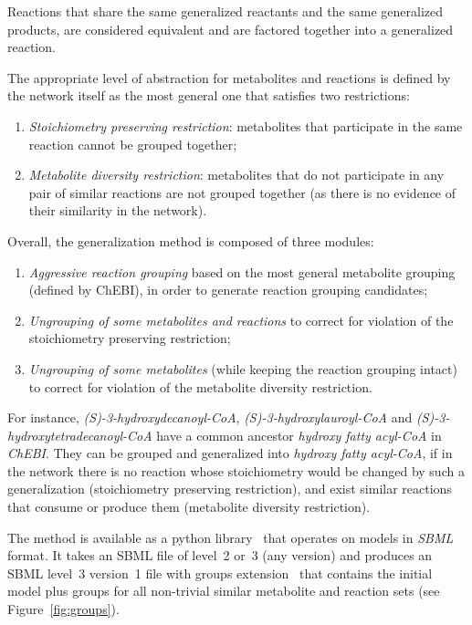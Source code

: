 \documentclass{bmcart}
\begin{document}
Reactions that share the same generalized reactants and the same generalized products, are considered equivalent and are factored together into a generalized reaction. 

The appropriate level of abstraction for metabolites and reactions is defined by the network itself as the most general one that satisfies two restrictions: 
\begin{enumerate}
 \item \emph{Stoichiometry preserving restriction}: metabolites that participate in the same reaction cannot be grouped together;
 \item \emph{Metabolite diversity restriction}: metabolites that do not participate in any pair of similar reactions are not grouped together (as there is no evidence of their similarity in the network).
\end{enumerate}

Overall, the generalization method is composed of three modules: 
\begin{enumerate}
\item \emph{Aggressive reaction grouping} based on the most general metabolite grouping (defined by ChEBI), in order to generate reaction grouping candidates;
\item \emph{Ungrouping of some metabolites and reactions} to correct for violation of the stoichiometry preserving restriction;
\item \emph{Ungrouping of some metabolites} (while keeping the reaction grouping intact) to correct for violation of the metabolite diversity restriction.
\end{enumerate} 

For instance, \textit{(S)-3-hydroxydecanoyl-CoA}, \textit{(S)-3-hydroxylauroyl-CoA} and \textit{(S)-3-hydroxytetradecanoyl-CoA} have a common ancestor \textit{hydroxy fatty acyl-CoA} in \textit{ChEBI}. They can be grouped and generalized into \textit{hydroxy fatty acyl-CoA}, if in the network there is no reaction whose stoichiometry would be changed by such a generalization (stoichiometry preserving restriction), and exist similar reactions that consume or produce them (metabolite diversity restriction).

The method is available as a python library~\cite{Metamogen} that operates on models in \textit{SBML}~\cite{Hucka08} format. It takes an SBML file of level~2 or~3 (any version) and produces an SBML level~3 version~1 file with groups extension~\cite{Hucka2012} that contains the initial model plus groups for all non-trivial similar metabolite and reaction sets (see Figure~\ref{fig:groups}).
\end{document}

